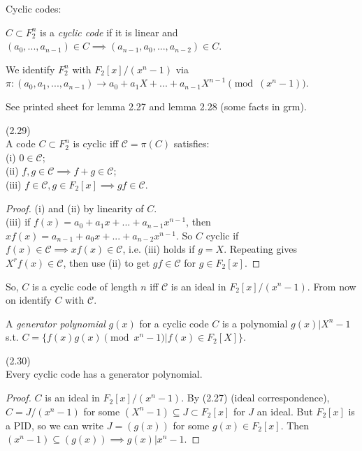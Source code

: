 \documentclass[a4paper]{article}
\begin{document}
Cyclic codes:
\begin{defi}
$C \subset F_2^n$ is a \emph{cyclic code} if it is linear and $(a_0,...,a_{n-1}) \in C \implies (a_{n-1},a_0,...,a_{n-2}) \in C$.

We identify $F_2^n$ with $F_2[x]/(x^n-1)$ via $\pi: (a_0,a_1,...,a_{n-1}) \to a_0+a_1 X + ... + a_{n-1} X^{n-1} \pmod (x^n-1)$.
\end{defi}

See printed sheet for lemma 2.27 and lemma 2.28 (some facts in grm).

\begin{lemma} (2.29)\\
A code $C \subset F_2^n$ is cyclic iff $\mathcal{C}=\pi (C)$ satisfies:\\
(i) $0 \in \mathcal{C}$;\\
(ii) $f,g \in \mathcal{C} \implies f+g \in \mathcal{C}$;\\
(iii) $f \in \mathcal{C}, g \in F_2[x] \implies gf \in \mathcal{C}$.
\begin{proof}
(i) and (ii) by linearity of $C$.\\
(iii) if $f(x) = a_0+a_1 x + ... + a_{n-1}x^{n-1}$, then $xf(x) = a_{n-1}+a_0 x + ... + a_{n-2} x^{n-1}$. So $C$ cyclic if $f(x) \in \mathcal{C} \implies xf(x) \in \mathcal{C}$, i.e. (iii) holds if $g=X$. Repeating gives $X^r f(x) \in \mathcal{C}$, then use (ii) to get $gf \in \mathcal{C}$ for $g \in F_2[x]$.
\end{proof}
\end{lemma}

\begin{rem}
So, $C$ is a cyclic code of length $n$ iff $\mathcal{C}$ is an ideal in $F_2[x]/(x^n-1)$. From now on identify $C$ with $\mathcal{C}$.
\end{rem}

\begin{defi}
A \emph{generator polynomial} $g(x)$ for a cyclic code $C$ is a polynomial $g(x) | X^n-1$ s.t. $C = \{f(x) g(x) \pmod {x^n-1} | f(x) \in F_2[X]\}$.
\end{defi}

\begin{thm} (2.30)\\
Every cyclic code has a generator polynomial.
\begin{proof}
$C$ is an ideal in $F_2[x]/(x^n-1)$. By (2.27) (ideal correspondence), $C = J/(x^n-1)$ for some $(X^n-1) \subseteq J \subset F_2[x]$ for  $J$ an ideal. But $F_2[x]$ is a PID, so we can write $J = (g(x))$ for some $g(x) \in F_2[x]$. Then $(x^n-1) \subseteq (g(x)) \implies g(x) | x^n-1$.
\end{proof}
\end{thm}
\end{document}
